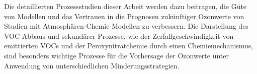 Die detaillierten Prozessstudien dieser Arbeit werden dazu beitragen, die Güte von Modellen und das Vertrauen in die Prognosen zukünftiger Ozonwerte von Studien mit Atmosphären-Chemie-Modellen zu verbessern.
Die Darstellung des VOC-Abbaus und sekundärer Prozesse, wie der Zerfallgeschwindigkeit von emittierten VOCs und der Peroxynitratchemie durch einen Chemiemechanismus, sind besonders wichtige Prozesse für die Vorhersage der Ozonwerte unter Anwendung von unterschiedlichen Minderungsstrategien.

